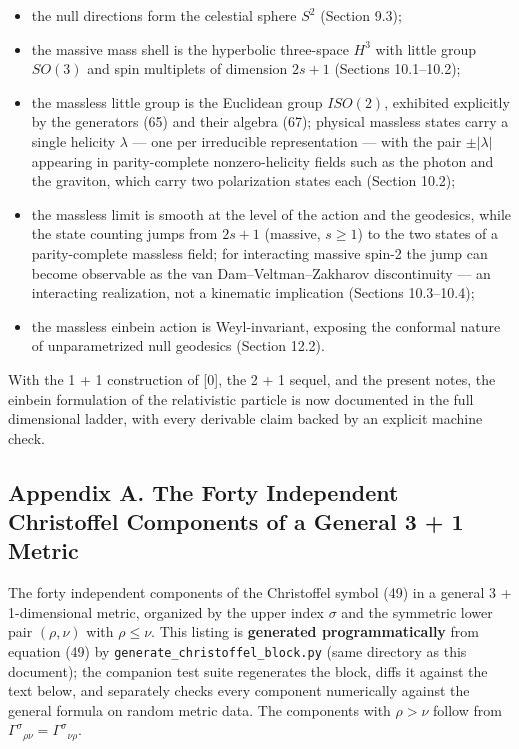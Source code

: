 \documentclass[
]{article}
\providecommand{\tightlist}{%
  \setlength{\itemsep}{0pt}\setlength{\parskip}{0pt}}
\begin{document}
\begin{itemize}
\tightlist
\item
  the null directions form the celestial sphere \(S^{2}\) (Section 9.3);
\item
  the massive mass shell is the hyperbolic three-space \(H^{3}\) with
  little group \(SO(3)\) and spin multiplets of dimension \(2s+1\)
  (Sections 10.1--10.2);
\item
  the massless little group is the Euclidean group \(ISO(2)\), exhibited
  explicitly by the generators (65) and their algebra (67); physical
  massless states carry a single helicity \(\lambda\) --- one per
  irreducible representation --- with the pair \(\pm|\lambda|\)
  appearing in parity-complete nonzero-helicity fields such as the
  photon and the graviton, which carry two polarization states each
  (Section 10.2);
\item
  the massless limit is smooth at the level of the action and the
  geodesics, while the state counting jumps from \(2s+1\) (massive,
  \(s \geq 1\)) to the two states of a parity-complete massless field;
  for interacting massive spin-2 the jump can become observable as the
  van Dam--Veltman--Zakharov discontinuity --- an interacting
  realization, not a kinematic implication (Sections 10.3--10.4);
\item
  the massless einbein action is Weyl-invariant, exposing the conformal
  nature of unparametrized null geodesics (Section 12.2).
\end{itemize}

With the 1 + 1 construction of {[}0{]}, the 2 + 1 sequel, and the
present notes, the einbein formulation of the relativistic particle is
now documented in the full dimensional ladder, with every derivable
claim backed by an explicit machine check.

\hypertarget{appendix-a.-the-forty-independent-christoffel-components-of-a-general-3-1-metric}{%
\subsection{Appendix A. The Forty Independent Christoffel Components of
a General 3 + 1
Metric}\label{appendix-a.-the-forty-independent-christoffel-components-of-a-general-3-1-metric}}

The forty independent components of the Christoffel symbol (49) in a
general 3 + 1-dimensional metric, organized by the upper index
\(\sigma\) and the symmetric lower pair \((\rho, \nu)\) with
\(\rho \leq \nu\). This listing is \textbf{generated programmatically}
from equation (49) by \texttt{generate\_christoffel\_block.py} (same
directory as this document); the companion test suite regenerates the
block, diffs it against the text below, and separately checks every
component numerically against the general formula on random metric data.
The components with \(\rho > \nu\) follow from
\(\Gamma^{\sigma}{}_{\rho\nu} = \Gamma^{\sigma}{}_{\nu\rho}\).
\end{document}
